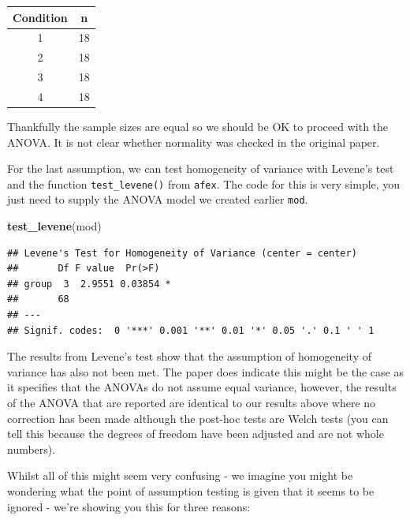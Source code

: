 \documentclass[]{book}
\newenvironment{Shaded}{\begin{snugshade}}{\end{snugshade}}
\newcommand{\KeywordTok}[1]{\textcolor[rgb]{0.13,0.29,0.53}{\textbf{#1}}}
\newcommand{\NormalTok}[1]{#1}
\newcommand{\OperatorTok}[1]{\textcolor[rgb]{0.81,0.36,0.00}{\textbf{#1}}}
\newcommand{\StringTok}[1]{\textcolor[rgb]{0.31,0.60,0.02}{#1}}
\begin{document}
\begin{Shaded}
\end{Shaded}

\begin{tabular}{c|c}
\hline
Condition & n\\
\hline
1 & 18\\
\hline
2 & 18\\
\hline
3 & 18\\
\hline
4 & 18\\
\hline
\end{tabular}

Thankfully the sample sizes are equal so we should be OK to proceed with the ANOVA. It is not clear whether normality was checked in the original paper.

For the last assumption, we can test homogeneity of variance with Levene's test and the function \texttt{test\_levene()} from \texttt{afex}. The code for this is very simple, you just need to supply the ANOVA model we created earlier \texttt{mod}.

\begin{Shaded}
\begin{Highlighting}[]
\KeywordTok{test_levene}\NormalTok{(mod)}
\end{Highlighting}
\end{Shaded}

\begin{verbatim}
## Levene's Test for Homogeneity of Variance (center = center)
##       Df F value  Pr(>F)  
## group  3  2.9551 0.03854 *
##       68                  
## ---
## Signif. codes:  0 '***' 0.001 '**' 0.01 '*' 0.05 '.' 0.1 ' ' 1
\end{verbatim}

The results from Levene's test show that the assumption of homogeneity of variance has also not been met. The paper does indicate this might be the case as it specifies that the ANOVAs do not assume equal variance, however, the results of the ANOVA that are reported are identical to our results above where no correction has been made although the post-hoc tests are Welch tests (you can tell this because the degrees of freedom have been adjusted and are not whole numbers).

Whilst all of this might seem very confusing - we imagine you might be wondering what the point of assumption testing is given that it seems to be ignored - we're showing you this for three reasons:
\end{document}
